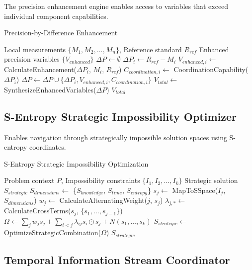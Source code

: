 \documentclass[12pt,a4paper]{article}
\begin{document}
The precision enhancement engine enables access to variables that exceed individual component capabilities.

\begin{algorithm}
\caption{Precision-by-Difference Enhancement}
\begin{algorithmic}[1]
\Require Local measurements $\{M_1, M_2, \ldots, M_n\}$, Reference standard $R_{ref}$
\Ensure Enhanced precision variables $\{V_{enhanced}\}$
\State $\Delta P \leftarrow \emptyset$
    \State $\Delta P_i \leftarrow R_{ref} - M_i$
    \State $V_{enhanced,i} \leftarrow$ CalculateEnhancement($\Delta P_i$, $M_i$, $R_{ref}$)
    \State $C_{coordination,i} \leftarrow$ CoordinationCapability($\Delta P_i$)
    \State $\Delta P \leftarrow \Delta P \cup \{\Delta P_i, V_{enhanced,i}, C_{coordination,i}\}$
\EndFor
\State $V_{total} \leftarrow$ SynthesizeEnhancedVariables($\Delta P$)
\State \Return $V_{total}$
\end{algorithmic}
\end{algorithm}

\subsection{S-Entropy Strategic Impossibility Optimizer}

Enables navigation through strategically impossible solution spaces using S-entropy coordinates.

\begin{algorithm}
\caption{S-Entropy Strategic Impossibility Optimization}
\begin{algorithmic}[1]
\Require Problem context $P$, Impossibility constraints $\{I_1, I_2, \ldots, I_k\}$
\Ensure Strategic solution $S_{strategic}$
\State $S_{dimensions} \leftarrow$ \{$S_{knowledge}$, $S_{time}$, $S_{entropy}$\}
    \State $s_j \leftarrow$ MapToSSpace($I_j$, $S_{dimensions}$)
    \State $w_j \leftarrow$ CalculateAlternatingWeight($j$, $s_j$)
    \State $\lambda_{j,*} \leftarrow$ CalculateCrossTerms($s_j$, $\{s_1, \ldots, s_{j-1}\}$)
\EndFor
\State $\Omega \leftarrow \sum_j w_j s_j + \sum_{i<j} \lambda_{ij} s_i \odot s_j + N(s_1, \ldots, s_k)$
\State $S_{strategic} \leftarrow$ OptimizeStrategicCombination($\Omega$)
\State \Return $S_{strategic}$
\end{algorithmic}
\end{algorithm}

\subsection{Temporal Information Stream Coordinator}
\end{document}
